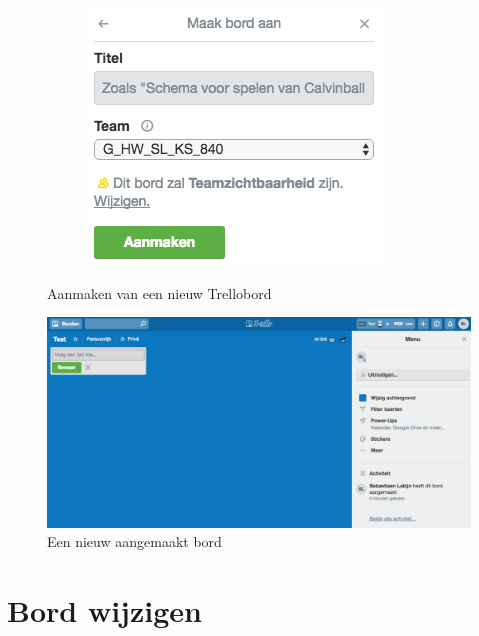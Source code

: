 \begin{figure}[H]
\begin{subfigure}{.5\textwidth}
		\label{fig:aanmaken}
	\end{subfigure}%
	\begin{subfigure}{.5\textwidth}
		\centering
		\includegraphics[width=\textwidth]{./afbeeldingen/nieuw_bord.png}
		\label{fig:nieuw_bord}
	\end{subfigure}
	\caption{Aanmaken van een nieuw Trellobord}
	\label{fig:aanmaken_bord}
\end{figure}

\begin{figure}[H]
	\centering
	\includegraphics[width=\textwidth]{./afbeeldingen/leeg_bord.png}
	\caption{Een nieuw aangemaakt bord}
	\label{fig:leeg_bord}	
\end{figure} 

\section{Bord wijzigen}


